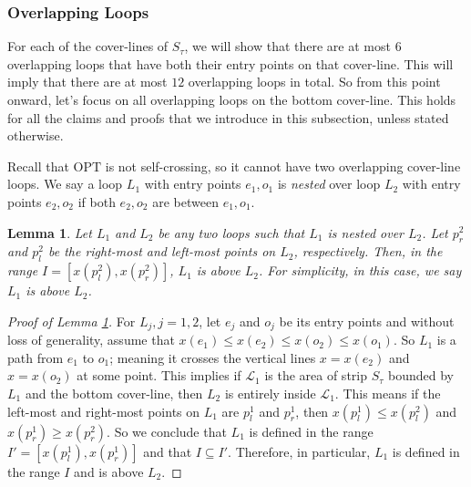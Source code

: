 \documentclass[pdflatex,sn-mathphys-num]{sn-jnl}
\theoremstyle{thmstyleone}
\newtheorem{lemma}{Lemma}
\newcommand{\OPT}{{\text{OPT}}}
\begin{document}
\subsubsection*{Overlapping Loops}
    
    For each of the cover-lines of $S_\tau$, we will show that there are at most $6$ overlapping loops that have both their entry points on that cover-line. This will imply that there are at most $12$ overlapping loops in total. So from this point onward, let's focus on all overlapping loops on the bottom cover-line. This holds for all the claims and proofs that we introduce in this subsection, unless stated otherwise.
    
    Recall that $\OPT$ is not self-crossing, so it cannot have two overlapping cover-line loops.
    We say a loop $L_1$ with entry points $e_1,o_1$ is {\em nested} over loop $L_2$ with entry points $e_2,o_2$
    if both $e_2,o_2$ are between $e_1,o_1$. 

\begin{lemma}\label{claim:nested-loop-above}
    Let $L_1$ and $L_2$ be any two loops such that $L_1$ is nested over $L_2$. Let $p^2_r$ and $p^2_l$ be the right-most and left-most points on $L_2$, respectively. Then, in the range $I = [x(p^2_l), x(p^2_r)]$, $L_1$ is above $L_2$. For simplicity, in this case, we say $L_1$ is above $L_2$.
\end{lemma}
\begin{proof}[Proof of Lemma \ref{claim:nested-loop-above}]
    For $L_j, j=1,2$, let $e_j$ and $o_j$ be its entry points and without loss of generality, assume that $x(e_1) \le x(e_2) \le x(o_2) \le x(o_1)$. So $L_1$ is a path  from $e_1$ to $o_1$; meaning it crosses the vertical lines $x = x(e_2)$ and $x = x(o_2)$ at some point. This implies if $\mathcal L_1$ is the area of strip $S_\tau$ bounded by $L_1$ and the bottom cover-line, then $L_2$ is entirely inside $\mathcal L_1$. This means if the left-most and right-most points on $L_1$ are $p^1_l$ and $p^1_r$, then $x(p^1_l) \le x(p^2_l)$ and $x(p^1_r) \ge x(p^2_r)$. So we conclude that $L_1$ is defined in the range $I' = [x(p^1_l), x(p^1_r)]$ and that 
    $I \subseteq I'$. Therefore, in particular, $L_1$ is defined in the range $I$ and is above $L_2$.
\end{proof}
\end{document}
